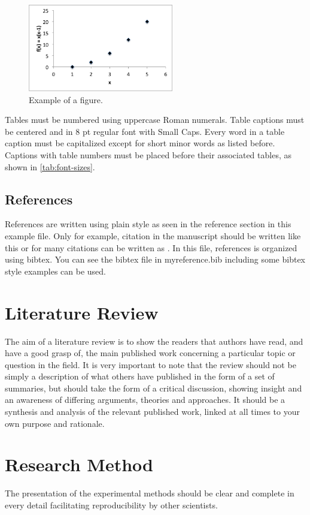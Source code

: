 \documentclass[]{indojc_single}
\begin{document}
\begin{figure}[!t]
\centering
\includegraphics[width=2.5in, keepaspectratio=true]{fig_example.png}
\caption{Example of a figure.}
\label{fig:oneexample}
\end{figure}

Tables must be numbered using uppercase Roman numerals. Table captions must be centered and in 8 pt regular font with Small Caps. Every word in a table caption must be capitalized except for short minor words as listed before. Captions with table numbers must be placed before their associated tables, as shown in \ref{tab:font-sizes}.

\subsection{References}
References are written using plain style as seen in the reference section in this example file. Only for example, citation in the manuscript should be written like this \cite{kopka1999guide} or for many citations can be written as \cite{lamport1994latex,swope1982computer,huo2007short}. In this file, references is organized using bibtex. You can see the bibtex file in myreference.bib including some bibtex style examples can be used.


\section{Literature Review}
The aim of a literature review is to show the readers that authors have read, and have a good grasp of, the main published work concerning a particular topic or question in the field. It is very important to note that the review should not be simply a description of what others have published in the form of a set of summaries, but should take the form of a critical discussion, showing insight and an awareness of differing arguments, theories and approaches. It should be a synthesis and analysis of the relevant published work, linked at all times to your own purpose and rationale.

\section{Research Method}
The presentation of the experimental methods should be clear and complete in every detail facilitating reproducibility by other scientists.
\end{document}
